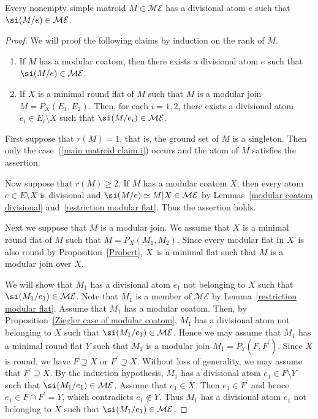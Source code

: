 \begin{Theorem}\label{main matroid}
Every nonempty simple matroid $ M \in \mathcal{ME} $ has a divisional atom $ e $ such that $ \si(M/e) \in \mathcal{ME} $.
\end{Theorem}
\begin{proof}
We will proof the following claims by induction on the rank of $ M $.
\begin{enumerate}[$(i)$]\itemsep=0pt
\item\label{main matroid claim i} If $ M $ has a modular coatom, then there exists a divisional atom $ e $ such that $ \si(M/e) \in \mathcal{ME} $.
\item\label{main matroid claim ii} If $ X $ is a minimal round flat of $ M $ such that $ M $ is a modular join $ M = P_{X}(E_{1}, E_{2}) $.
Then, for each $ i=1,2 $, there exists a divisional atom $ e_{i} \in E_{i}\setminus X $ such that $ \si(M/e_{i}) \in \mathcal{ME} $.
\end{enumerate}

First suppose that $ r(M) = 1 $, that is, the ground set of $ M $ is a singleton.
Then only the case~(\ref{main matroid claim i}) occurs and the atom of $ M $ satisfies the assertion.

Now suppose that $ r(M) \geq 2 $.
If $ M $ has a modular coatom $ X $, then every atom $ e \in E \setminus X $ is divisional and $ \si(M/e) \simeq M|X \in \mathcal{ME} $ by Lemmas~\ref{modular coatom divisional} and~\ref{restriction modular flat}. Thus the assertion holds.

Next we suppose that $ M $ is a modular join.
We assume that $ X $ is a minimal round flat of $ M $ such that $ M = P_{X}(M_{1},M_{2}) $.
Since every modular flat in $ X $~is also round by Proposition~\ref{Probert}, $ X $~is a minimal flat such that $ M $ is a modular join over $ X $.

We will show that $ M_{1} $ has a divisional atom $ e_{1} $ not belonging to $ X $ such that $ \si(M_{1}/e_{1}) \in \mathcal{ME} $.
Note that $ M_{1} $ is a member of $ \mathcal{ME} $ by Lemma~\ref{restriction modular flat}.
Assume that $ M_{1} $ has a modular coatom.
Then, by Proposition~\ref{Ziegler case of modular coatom}, $ M_{1} $ has a divisional atom not belonging to $ X $ such that $ \si(M_{1}/e_{1}) \in \mathcal{ME} $.
Hence we may assume that $ M_{1} $ has a minimal round flat $ Y $ such that $ M_{1} $ is a modular join $ M_{1} = P_{Y}(F,F^{\prime})$.
Since $ X $ is round, we have $ F \supseteq X $ or $ F^{\prime} \supseteq X $.
Without loss of generality, we may assume that $ F^{\prime} \supseteq X $.
By the induction hypothesis, $ M_{1} $ has a divisional atom $ e_{1} \in F\setminus Y $ such that $ \si(M_{1}/e_{1}) \in \mathcal{ME} $.
Assume that $ e_{1} \in X $.
Then $ e_{1} \in F^{\prime} $ and hence $ e_{1} \in F \cap F^{\prime} = Y $, which contradicts $ e_{1} \not\in Y $.
Thus $ M_{1} $ has a divisional atom $ e_{1} $ not belonging to $ X $ such that $ \si(M_{1}/e_{1}) \in \mathcal{ME} $.


\end{proof}
